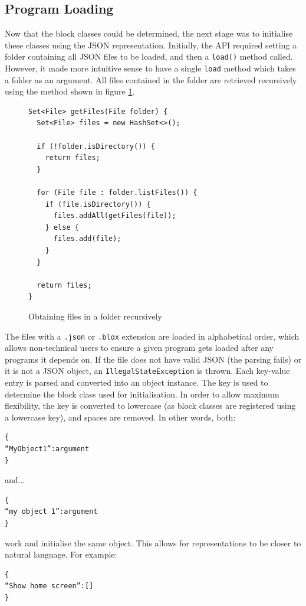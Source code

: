 \subsection{Program Loading}
Now that the block classes could be determined, the next stage was to initialise these classes using the JSON representation. Initially, the API required setting a folder containing all JSON files to be loaded, and then a \texttt{load()} method called. However, it made more intuitive sense to have a single \texttt{load} method which takes a folder as an argument. All files contained in the folder are retrieved recursively using the method shown in figure \ref{fig:files_in_folder}.
\begin{figure}
\centering
\caption{Obtaining files in a folder recursively}
\label{fig:files_in_folder}
\begin{verbatim}
Set<File> getFiles(File folder) {
  Set<File> files = new HashSet<>();

  if (!folder.isDirectory()) {
    return files;
  }

  for (File file : folder.listFiles()) {
    if (file.isDirectory()) {
      files.addAll(getFiles(file));
    } else {
      files.add(file);
    }
  }

  return files;
}
\end{verbatim}
\end{figure}
\par
The files with a \texttt{.json} or \texttt{.blox} extension are loaded in alphabetical order, which allows non-technical users to ensure a given program gets loaded after any programs it depends on. If the file does not have valid JSON (the parsing fails) or it is not a JSON object, an \texttt{IllegalStateException} is thrown. Each key-value entry is parsed and converted into an object instance. The key is used to determine the block class used for initialisation. In order to allow maximum flexibility, the key is converted to lowercase (as block classes are registered using a lowercase key), and spaces are removed. In other words, both:
\begin{verbatim}
{
“MyObject1”:argument
}
\end{verbatim}
and...
\begin{verbatim}
{ 
“my object 1”:argument
}
\end{verbatim}
work and initialise the same object. This allows for representations to be closer to natural language. For example:
\begin{verbatim}
{
“Show home screen”:[]
}
\end{verbatim}
